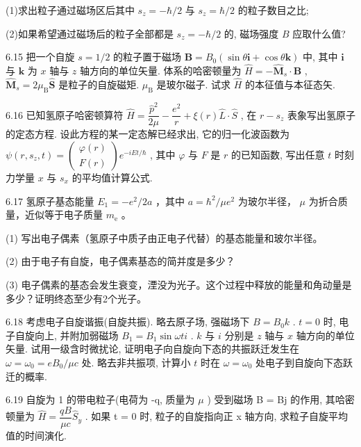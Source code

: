 (1)求出粒子通过磁场区后其中 $s_z = -\hbar / 2$ 与 $s_z = \hbar / 2$ 的粒子数目之比; 

(2)如果希望通过磁场后的粒子全部都是 $s_z = -\hbar / 2$ 的, 磁场强度 $B$ 应取什么值?

\vfill\newpage

6.15 把一个自旋 $s = 1 / 2$ 的粒子置于磁场 $\pmb{B} = B_0(\sin \theta \mathbf{i} + \cos \theta \mathbf{k})$ 中, 其中 $\pmb{i}$ 与 $\pmb{k}$ 为 $x$ 轴与 $z$ 轴方向的单位矢量. 体系的哈密顿量为 $\hat{H} = -\hat{\pmb{M}}_s \cdot \pmb{B}$ , $\hat{\pmb{M}}_s = 2\mu_{\mathrm{B}}\hat{\pmb{S}}$ 是粒子的自旋磁矩. $\mu_{\mathrm{B}}$ 是玻尔磁子. 试求 $\hat{H}$ 的本征值与本征态矢.

\vfill\newpage

6.16 已知氢原子哈密顿算符 $\hat{H} = \dfrac{\hat{p}^2}{2\mu} - \dfrac{e^2}{r} + \xi(r)\hat{L} \cdot \hat{S}$ , 在 $r - s_z$ 表象写出氢原子的定态方程. 设此方程的某一定态解已经求出, 它的归一化波函数为 $\psi(r, s_z, t) = \begin{pmatrix} \varphi(r) \\ F(r) \end{pmatrix} e^{-iEt/\hbar}$ , 其中 $\varphi$ 与 $F$ 是 $r$ 的已知函数, 写出任意 $t$ 时刻力学量 $x$ 与 $s_x$ 的平均值计算公式.

\vfill\newpage

6.17 氢原子基态能量 $E_{1} = -e^{2} / 2a$ ，其中 $a = \hbar^{2} / \mu e^{2}$ 为玻尔半径， $\mu$ 为折合质量，近似等于电子质量 $m_{\mathrm{e}}$ 。

(1) 写出电子偶素（氢原子中质子由正电子代替）的基态能量和玻尔半径。

(2) 由于电子有自旋，电子偶素基态的简并度是多少？

(3) 电子偶素的基态会发生衰变，湮没为光子。这个过程中释放的能量和角动量是多少？证明终态至少有2个光子。

\vfill\newpage

6.18 考虑电子自旋谐振(自旋共振). 略去原子场, 强磁场下 $B = B_{0}k$ . $t = 0$ 时, 电子自旋向上, 并附加弱磁场 $B_{1} = B_{1}\sin \omega t i$ . $k$ 与 $i$ 分别是 $z$ 轴与 $x$ 轴方向的单位矢量. 试用一级含时微扰论, 证明电子向自旋向下态的共振跃迁发生在 $\omega = \omega_{0} = eB_{0} / \mu c$ 处. 略去非共振项, 计算小 $t$ 时在 $\omega = \omega_{0}$ 处电子到自旋向下态跃迁的概率.

\vfill\newpage

6.19 自旋为 1 的带电粒子(电荷为 -q, 质量为 $\mu$ ) 受到磁场 B = Bj 的作用, 其哈密顿量为 $\hat{H} = \dfrac{qB}{\mu c} \hat{S}_{y}$ . 如果 t = 0 时, 粒子的自旋指向正 x 轴方向, 求粒子自旋平均值的时间演化.

